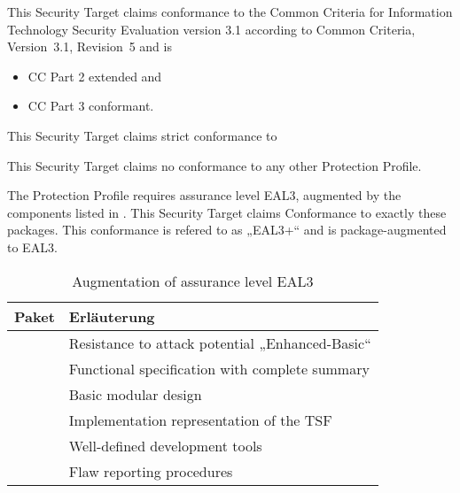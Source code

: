 

This Security Target claims conformance to the Common Criteria for
Information Technology Security Evaluation version 3.1 according to Common
Criteria, Version~3.1, Revision~5 and is

\begin{itemize}
\item CC Part 2 \autocite{CCPart2} extended and
\item CC Part 3 \autocite{CCPart3} conformant.
\end{itemize}


This Security Target claims strict conformance to


\noindent{}This Security Target claims no conformance to any other Protection
Profile.


The Protection Profile requires assurance level EAL3, augmented by the
components listed in . This Security Target claims
Conformance to exactly these packages. This conformance is refered to as „EAL3+“
and is package-augmented to EAL3.

\begin{table}[htbp]
  \centering
  \begin{tabularx}{0.7\textwidth}{@{}lY@{}}
    \toprule
    Paket & Erläuterung \\
    \midrule
     & Resistance to attack potential „Enhanced-Basic“\\
     & Functional specification with complete summary\\
     & Basic modular design\\
     & Implementation representation of the TSF\\
     & Well-defined development tools\\
     & Flaw reporting procedures\\
    \bottomrule
  \end{tabularx}
  \caption{Augmentation of assurance level EAL3}
  \label{tab:conf.eal3plus}
\end{table}

